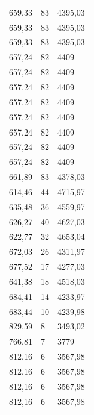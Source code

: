 \begin{center}
\begin{longtable}{|l|l|l|}
659,33            & 83               & 4395,03        \\
659,33            & 83               & 4395,03        \\
659,33            & 83               & 4395,03        \\
657,24            & 82               & 4409           \\
657,24            & 82               & 4409           \\
657,24            & 82               & 4409           \\
657,24            & 82               & 4409           \\
657,24            & 82               & 4409           \\
657,24            & 82               & 4409           \\
657,24            & 82               & 4409           \\
657,24            & 82               & 4409           \\
661,89            & 83               & 4378,03        \\
614,46            & 44               & 4715,97        \\
635,48            & 36               & 4559,97        \\
626,27            & 40               & 4627,03        \\
622,77            & 32               & 4653,04        \\
672,03            & 26               & 4311,97        \\
677,52            & 17               & 4277,03        \\
641,38            & 18               & 4518,03        \\
684,41            & 14               & 4233,97        \\
683,44            & 10               & 4239,98        \\
829,59            & 8                & 3493,02        \\
766,81            & 7                & 3779           \\
812,16            & 6                & 3567,98        \\
812,16            & 6                & 3567,98        \\
812,16            & 6                & 3567,98        \\
812,16            & 6                & 3567,98        \\

\end{longtable}
\end{center}
